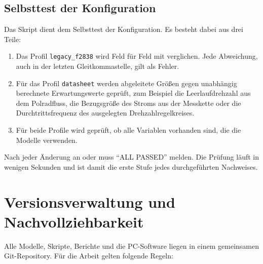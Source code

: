 \subsection{Selbsttest der Konfiguration}

Das Skript  dient dem Selbsttest der Konfiguration. Es besteht dabei aus drei Teile:

\begin{enumerate}
  \item Das Profil \texttt{legacy\_f2838} wird Feld für Feld mit
     verglichen. Jede Abweichung, auch in der letzten
    Gleitkommastelle, gilt als Fehler.
  \item Für das Profil \texttt{datasheet} werden abgeleitete Größen gegen unabhängig
    berechnete Erwartungswerte geprüft, zum Beispiel die Leerlaufdrehzahl aus dem
    Polradfluss, die Bezugsgröße des Stroms aus der Messkette oder die Durchtrittsfrequenz
    des ausgelegten Drehzahlregelkreises.
  \item Für beide Profile wird geprüft, ob alle Variablen vorhanden sind, die die Modelle
    verwenden.
\end{enumerate}

Nach jeder Änderung an  oder  muss 
\enquote{ALL PASSED} melden. Die Prüfung läuft in wenigen Sekunden und ist damit die erste
Stufe jedes durchgeführten Nachweises.

\section{Versionsverwaltung und Nachvollziehbarkeit}
\label{sec:git}

Alle Modelle, Skripte, Berichte und die PC-Software liegen in einem gemeinsamen
Git-Repository. Für die Arbeit gelten folgende Regeln:

